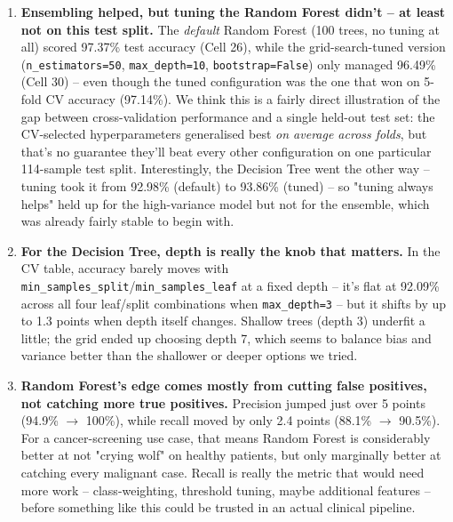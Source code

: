 \documentclass[12pt,a4paper]{article}
\begin{document}
\begin{enumerate}
    \item \textbf{Ensembling helped, but tuning the Random Forest didn't -- at least not on this test split.} The \emph{default} Random Forest (100 trees, no tuning at all) scored 97.37\% test accuracy (Cell 26), while the grid-search-tuned version (\texttt{n\_estimators=50}, \texttt{max\_depth=10}, \texttt{bootstrap=False}) only managed 96.49\% (Cell 30) -- even though the tuned configuration was the one that won on 5-fold CV accuracy (97.14\%). We think this is a fairly direct illustration of the gap between cross-validation performance and a single held-out test set: the CV-selected hyperparameters generalised best \emph{on average across folds}, but that's no guarantee they'll beat every other configuration on one particular 114-sample test split. Interestingly, the Decision Tree went the other way -- tuning took it from 92.98\% (default) to 93.86\% (tuned) -- so "tuning always helps" held up for the high-variance model but not for the ensemble, which was already fairly stable to begin with.
    \item \textbf{For the Decision Tree, depth is really the knob that matters.} In the CV table, accuracy barely moves with \texttt{min\_samples\_split}/\texttt{min\_samples\_leaf} at a fixed depth -- it's flat at 92.09\% across all four leaf/split combinations when \texttt{max\_depth=3} -- but it shifts by up to 1.3 points when depth itself changes. Shallow trees (depth 3) underfit a little; the grid ended up choosing depth 7, which seems to balance bias and variance better than the shallower or deeper options we tried.
    \item \textbf{Random Forest's edge comes mostly from cutting false positives, not catching more true positives.} Precision jumped just over 5 points (94.9\% $\to$ 100\%), while recall moved by only 2.4 points (88.1\% $\to$ 90.5\%). For a cancer-screening use case, that means Random Forest is considerably better at not "crying wolf" on healthy patients, but only marginally better at catching every malignant case. Recall is really the metric that would need more work -- class-weighting, threshold tuning, maybe additional features -- before something like this could be trusted in an actual clinical pipeline.
\end{enumerate}
\end{document}
